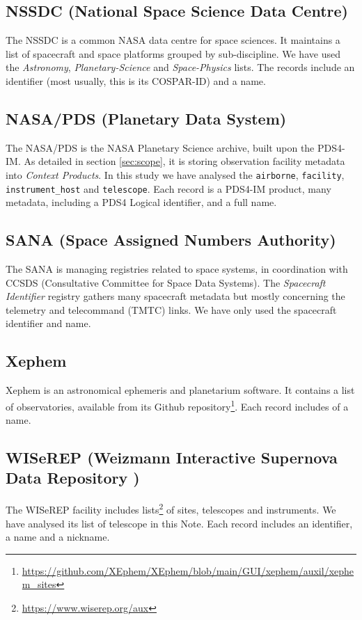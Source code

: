 \documentclass[11pt,a4paper]{ivoa}
\begin{document}
\subsection{NSSDC (National Space Science Data Centre)}
The NSSDC is a common NASA data centre for space sciences. It maintains
a list of 
spacecraft and space platforms grouped by sub-discipline.
We have used the \emph{Astronomy}, \emph{Planetary-Science} and 
\emph{Space-Physics} lists. The records include an 
identifier (most usually, this is its COSPAR-ID) and a name.

\subsection{NASA/PDS (Planetary Data System)}
The NASA/PDS is the NASA Planetary Science archive, built upon the 
PDS4-IM. As detailed in section \ref{sec:scope}, it is storing 
observation facility metadata into \emph{Context Products}. In this 
study we have analysed the \texttt{airborne}, \texttt{facility},  
\texttt{instrument\_host} and \texttt{telescope}. Each record is 
a PDS4-IM product, many metadata, including a PDS4 Logical 
identifier, and a full name.

\subsection{SANA (Space Assigned Numbers Authority)}
The SANA is managing registries related to space systems, in 
coordination with CCSDS (Consultative Committee for Space Data
Systems). The \emph{Spacecraft Identifier} registry gathers many
spacecraft metadata but mostly concerning the telemetry and 
telecommand (TMTC) links. We have only used the 
spacecraft identifier and name.  

\subsection{Xephem}
Xephem is an astronomical ephemeris and planetarium software. It
contains a list of observatories, available from its Github 
repository\footnote{\url{https://github.com/XEphem/XEphem/blob/main/GUI/xephem/auxil/xephem_sites}}.
Each record includes of a name.
  
\subsection{WISeREP (Weizmann Interactive Supernova Data Repository )}
The WISeREP facility includes lists\footnote{\url{https://www.wiserep.org/aux}} 
of sites, telescopes and instruments. We have analysed its list of telescope 
in this Note. Each record includes an identifier, a name and a 
nickname.
\end{document}
